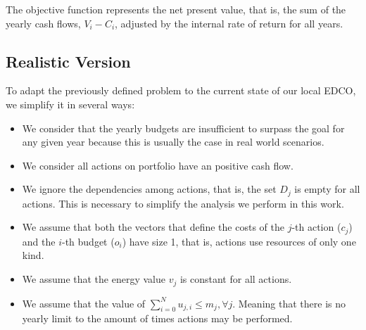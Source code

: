 The objective function represents the net present value, that is,
the sum of the yearly cash flows, $V_i - C_i$, adjusted by the internal rate of return for all years.

\subsection{Realistic Version}

To adapt the previously defined problem to the current state of our local EDCO, we simplify it in several  ways:

\begin{itemize}
\item We consider that the yearly budgets are insufficient to surpass the goal for any given year
because this is usually the case in real world scenarios. %

\item We consider all actions on portfolio have an positive cash flow.

%

\item We ignore the dependencies among actions, that is, the set $D_j$ is empty
for all actions. This is necessary to simplify the analysis we perform in this work.

\item We assume that both the vectors that define the costs of the $j$-th  action ($c_j$)
and the $i$-th budget ($o_i$) have size 1, that is, actions use resources of only
one kind.

\item We assume that the energy value $v_j$ is constant for all actions.

\item We assume that the value of $\sum_{i=0}^{N} u_{j,i} \leq m_j, \forall j$.
Meaning that there is no yearly limit to the amount of times actions may be
performed.

\end{itemize}





